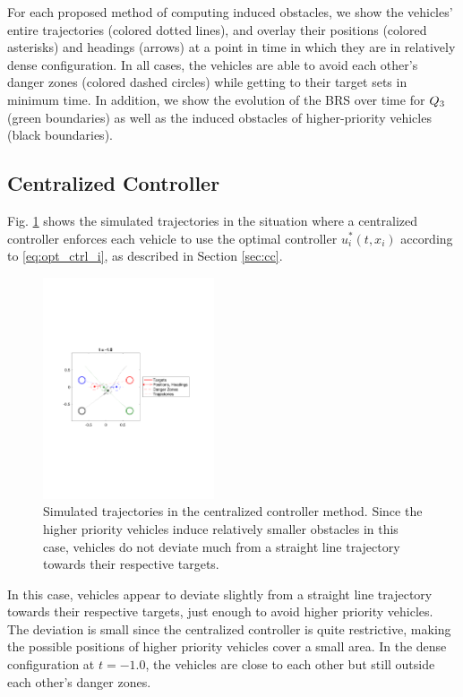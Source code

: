 For each proposed method of computing induced obstacles, we show the vehicles' entire trajectories (colored dotted lines), and overlay their positions (colored asterisks) and headings (arrows) at a point in time in which they are in relatively dense configuration. In all cases, the vehicles are able to avoid each other's danger zones (colored dashed circles) while getting to their target sets in minimum time. In addition, we show the evolution of the BRS over time for $Q_3$ (green boundaries) as well as the induced obstacles of higher-priority vehicles (black boundaries).

\subsection{Centralized Controller}
Fig. \ref{fig:cc_traj} shows the simulated trajectories in the situation where a centralized controller enforces each vehicle to use the optimal controller $u^*_i(t, x_i)$ according to \eqref{eq:opt_ctrl_i}, as described in Section \ref{sec:cc}.

\begin{figure}
  \centering
  \includegraphics[width=0.45\textwidth]{"fig/cc_traj"}
  \caption{Simulated trajectories in the centralized controller method. Since the higher priority vehicles induce relatively smaller obstacles in this case, vehicles do not deviate much from a straight line trajectory towards their respective targets.}
  \label{fig:cc_traj}
\end{figure}

In this case, vehicles appear to deviate slightly from a straight line trajectory towards their respective targets, just enough to avoid higher priority vehicles. The deviation is small since the centralized controller is quite restrictive, making the possible positions of higher priority vehicles cover a small area. In the dense configuration at $t=-1.0$, the vehicles are close to each other but still outside each other's danger zones.

